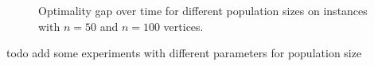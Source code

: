 \documentclass[12pt]{article}
\begin{document}
\begin{figure}
\begin{subfigure}[b]{0.475\textwidth}
            \caption%
            {{\small }}     
            \label{fig:mean and std of net24}
        \end{subfigure}
        \caption
        {\small Optimality gap over time for different population sizes on instances with $n=50$ and $n=100$ vertices. } 
        \label{fig:mean and std of nets}
    \end{figure}


todo add some experiments with different parameters for population size




\end{document}
